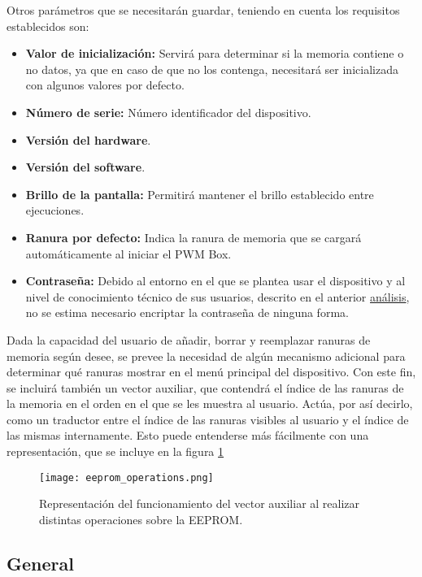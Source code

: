Otros parámetros que se necesitarán guardar, teniendo en cuenta los requisitos establecidos son:

\begin{itemize}
    \item\textbf{Valor de inicialización:} Servirá para determinar si la memoria contiene o no datos, ya que en caso de que no los contenga, necesitará ser inicializada con algunos valores por defecto.
    \item\textbf{Número de serie:} Número identificador del dispositivo.
    \item\textbf{Versión del hardware}.
    \item\textbf{Versión del software}.
    \item\textbf{Brillo de la pantalla:} Permitirá mantener el brillo establecido entre ejecuciones.
    \item\textbf{Ranura por defecto:} Indica la ranura de memoria que se cargará automáticamente al iniciar el PWM Box.
    \item\textbf{Contraseña:} Debido al entorno en el que se plantea usar el dispositivo y al nivel de conocimiento técnico de sus usuarios, descrito en el anterior \hyperref[sec:fw_analisis]{análisis}, no se estima necesario encriptar la contraseña de ninguna forma.
\end{itemize}

Dada la capacidad del usuario de añadir, borrar y reemplazar ranuras de memoria según desee, se prevee la necesidad de algún mecanismo adicional para determinar qué ranuras mostrar en el menú principal del dispositivo. Con este fin, se incluirá también un vector auxiliar, que contendrá el índice de las ranuras de la memoria en el orden en el que se les muestra al usuario. Actúa, por así decirlo, como un traductor entre el índice de las ranuras visibles al usuario y el índice de las mismas internamente. Esto puede entenderse más fácilmente con una representación, que se incluye en la figura \ref{fig:eeprom_operations}

\begin{figure}[h!]
    \centering
    \texttt{[image: eeprom\_operations.png]}
    \caption{Representación del funcionamiento del vector auxiliar al realizar distintas operaciones sobre la EEPROM.}
    \label{fig:eeprom_operations}
\end{figure}

\subsection{General}

